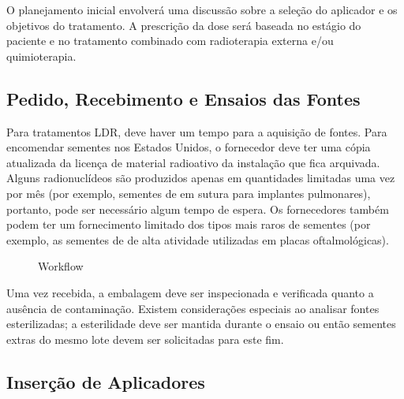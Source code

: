 \documentclass[11pt,a4paper]{article}
\newcounter{exemplo}
\begin{document}
	O planejamento inicial envolverá uma discussão sobre a seleção do aplicador e os objetivos do tratamento. A prescrição da dose será baseada no estágio do paciente e no tratamento combinado com radioterapia externa e/ou quimioterapia.

\subsection*{Pedido, Recebimento e Ensaios das Fontes}

	Para tratamentos LDR, deve haver um tempo para a aquisição de fontes. Para encomendar sementes nos Estados Unidos, o fornecedor deve ter uma cópia atualizada da licença de material radioativo da instalação que fica arquivada. Alguns radionuclídeos são produzidos apenas em quantidades limitadas uma vez por mês (por exemplo, sementes de  em sutura para implantes pulmonares), portanto, pode ser necessário algum tempo de espera. Os fornecedores também podem ter um fornecimento limitado dos tipos mais raros de sementes (por exemplo, as sementes de  de alta atividade utilizadas em placas oftalmológicas). 

	\begin{figure}
		\centering
		\caption{Workflow}
		\label{fig:workflowBraquiterapia}
	\end{figure}

	Uma vez recebida, a embalagem deve ser inspecionada e verificada quanto a ausência de contaminação. Existem considerações especiais ao analisar fontes esterilizadas; a esterilidade deve ser mantida durante o ensaio ou então sementes extras do mesmo lote devem ser solicitadas para este fim.

\subsection*{Inserção de Aplicadores}
\end{document}
